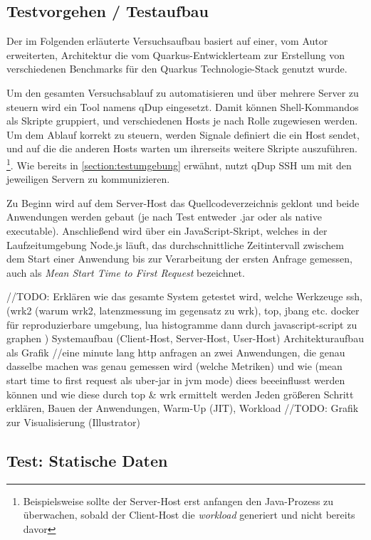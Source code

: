 \subsection{Testvorgehen / Testaufbau}
\label{section:vorgehen}
Der im Folgenden erläuterte Versuchsaufbau basiert auf einer, vom Autor erweiterten, Architektur die vom Quarkus-Entwicklerteam 
  zur Erstellung von verschiedenen Benchmarks für den Quarkus Technologie-Stack genutzt wurde. 
  \parencite{QuarkusBlog, QuarkusJohnaohara}

  Um den gesamten Versuchsablauf zu automatisieren und über mehrere Server zu steuern wird ein Tool namens qDup eingesetzt.
  Damit können Shell-Kommandos als Skripte gruppiert, und verschiedenen Hosts je nach Rolle zugewiesen werden.
  Um dem Ablauf korrekt zu steuern, werden Signale definiert die ein Host sendet, und auf die die anderen Hosts warten um ihrerseits
  weitere Skripte auszuführen.
  \footnote{Beispielsweise sollte der Server-Host erst anfangen den Java-Prozess zu überwachen, sobald der Client-Host die \textit{workload}
  generiert und nicht bereits davor}.
  Wie bereits in \ref{section:testumgebung} erwähnt, nutzt qDup SSH um mit den jeweiligen Servern zu kommunizieren.

  Zu Beginn wird auf dem Server-Host das Quellcodeverzeichnis geklont und beide Anwendungen werden gebaut (je nach Test entweder
  .jar oder als native executable). Anschließend wird über ein JavaScript-Skript, welches in der Laufzeitumgebung Node.js läuft, das 
  durchschnittliche Zeitintervall zwischem dem Start einer Anwendung bis zur Verarbeitung der ersten Anfrage gemessen, auch als
  \textit{Mean Start Time to First Request} bezeichnet. 


  
 //TODO: Erklären wie das gesamte System getestet wird, welche Werkzeuge ssh, (wrk2 (warum wrk2,
  latenzmessung im gegensatz zu wrk), top, jbang etc.
docker für reproduzierbare umgebung, lua histogramme dann durch javascript-script zu graphen )
Systemaufbau (Client-Host, Server-Host, User-Host)
Architekturaufbau als Grafik
//eine minute lang http anfragen an zwei Anwendungen, die genau dasselbe machen
was genau gemessen wird (welche Metriken) und wie (mean start time to first request als uber-jar in jvm mode)
diees beeeinflusst werden können und wie diese durch top \& wrk ermittelt werden
Jeden größeren Schritt erklären, Bauen der Anwendungen, Warm-Up (JIT), Workload
//TODO: Grafik zur Visualisierung (Illustrator)
\subsection{Test: Statische Daten}
\label{section:statische_daten}

